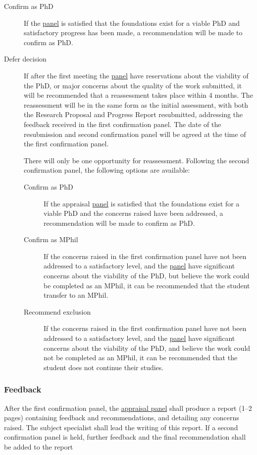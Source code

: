 \documentclass[12pt,a4paper]{article}
\begin{document}
\begin{description}
	\item[Confirm as PhD] If the \hyperref[sec:panel]{panel} is satisfied that the foundations exist for a viable PhD and satisfactory progress has been made, a recommendation will be made to confirm as PhD.
	\item[Defer decision] If after the first meeting the \hyperref[sec:panel]{panel} have reservations about the viability of the PhD, or major concerns about the quality of the work submitted, it will be recommended that a reassessment takes place within 4 months. The reassessment will be in the same form as the initial assessment, with both the Research Proposal and Progress Report resubmitted, addressing the feedback received in the first confirmation panel. The date of the resubmission and second confirmation panel will be agreed at the time of the first confirmation panel.
	
	There will only be one opportunity for reassessment. Following the second confirmation panel, the following options are available:
	\begin{description}
		\item[Confirm as PhD] If the appraisal \hyperref[sec:panel]{panel} is satisfied that the foundations exist for a viable PhD and the concerns raised have been addressed, a recommendation will be made to confirm as PhD.
		\item[Confirm as MPhil] If the concerns raised in the first confirmation panel have not been addressed to a satisfactory level, and the \hyperref[sec:panel]{panel} have significant concerns about the viability of the PhD, but believe the work could be completed as an MPhil, it can be recommended that the student transfer to an MPhil.
		\item[Recommend exclusion] If the concerns raised in the first confirmation panel have not been addressed to a satisfactory level, and the \hyperref[sec:panel]{panel} have significant concerns about the viability of the PhD, and believe the work could not be completed as an MPhil, it can be recommended that the student does not continue their studies.
	\end{description}
\end{description}

\subsubsection{Feedback}
After the first confirmation panel, the \hyperref[sec:panel]{appraisal panel} shall produce a report (1--2 pages) containing feedback and recommendations, and detailing any concerns raised. The subject specialist shall lead the writing of this report. If a second confirmation panel is held, further feedback and the final recommendation shall be added to the report
\end{document}

